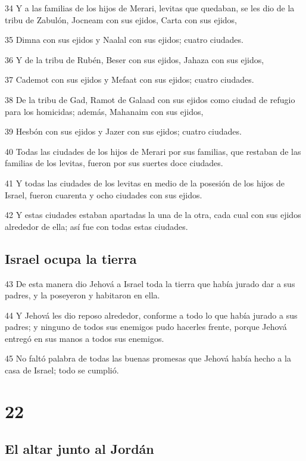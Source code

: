 \par 34 Y a las familias de los hijos de Merari, levitas que quedaban, se les dio de la tribu de Zabulón, Jocneam con sus ejidos, Carta con sus ejidos,
\par 35 Dimna con sus ejidos y Naalal con sus ejidos; cuatro ciudades.
\par 36 Y de la tribu de Rubén, Beser con sus ejidos, Jahaza con sus ejidos,
\par 37 Cademot con sus ejidos y Mefaat con sus ejidos; cuatro ciudades.
\par 38 De la tribu de Gad, Ramot de Galaad con sus ejidos como ciudad de refugio para los homicidas; además, Mahanaim con sus ejidos, 
\par 39 Hesbón con sus ejidos y Jazer con sus ejidos; cuatro ciudades.
\par 40 Todas las ciudades de los hijos de Merari por sus familias, que restaban de las familias de los levitas, fueron por sus suertes doce ciudades.
\par 41 Y todas las ciudades de los levitas en medio de la posesión de los hijos de Israel, fueron cuarenta y ocho ciudades con sus ejidos.
\par 42 Y estas ciudades estaban apartadas la una de la otra, cada cual con sus ejidos alrededor de ella; así fue con todas estas ciudades.

\section*{Israel ocupa la tierra}

\par 43 De esta manera dio Jehová a Israel toda la tierra que había jurado dar a sus padres, y la poseyeron y habitaron en ella.
\par 44 Y Jehová les dio reposo alrededor, conforme a todo lo que había jurado a sus padres; y ninguno de todos sus enemigos pudo hacerles frente, porque Jehová entregó en sus manos a todos sus enemigos.
\par 45 No faltó palabra de todas las buenas promesas que Jehová había hecho a la casa de Israel; todo se cumplió.

\chapter{22}

\section*{El altar junto al Jordán}

